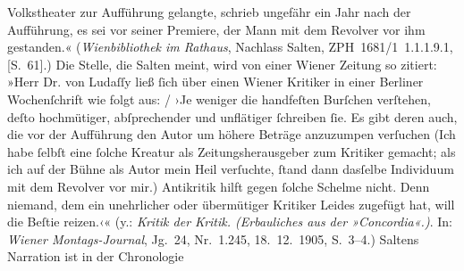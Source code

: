 \begin{ledgroupsized}[t]{13cm}
{{{                        Volkstheater zur Aufführung gelangte, schrieb ungefähr ein Jahr nach
                     der Aufführung, es sei vor seiner Premiere, der Mann mit dem Revolver vor ihm
                     gestanden.« (\emph{Wienbibliothek im Rathaus}, Nachlass Salten, ZPH 1681/1 1.1.1.9.1, [S. 61].) Die
                  Stelle, die Salten meint, wird von einer Wiener Zeitung so zitiert: »Herr Dr.
                           von Ludaſſy ließ ſich über einen
                           Wiener Kritiker in einer Berliner Wochenſchrift wie folgt aus:{ / }›Je weniger die handfeſten Burſchen verſtehen, deſto hochmütiger,
                        abſprechender und unflätiger ſchreiben ſie. Es gibt deren auch, die vor der
                        Aufführung den Autor um höhere Beträge anzuzumpen verſuchen (Ich habe ſelbſt
                        eine ſolche Kreatur als Zeitungsherausgeber zum Kritiker gemacht; als ich
                        auf der Bühne als Autor mein Heil verſuchte, ſtand dann dasſelbe Individuum
                        mit dem Revolver vor mir.) Antikritik hilft gegen ſolche Schelme nicht. Denn
                        niemand, dem ein unehrlicher oder übermütiger Kritiker Leides zugefügt hat,
                        will die Beſtie reizen.‹« (y.: \emph{Kritik der Kritik. (Erbauliches aus der »Concordia«.)}.
                     In: \emph{Wiener Montags-Journal}, Jg. 24,
                     Nr. 1.245, 18. 12. 1905, S. 3–4.) Saltens Narration ist in der Chronologie
}}}
\end{ledgroupsized}
